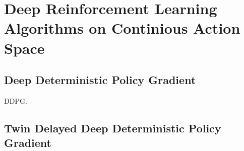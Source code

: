 \section{Deep Reinforcement Learning Algorithms on Continious Action Space}

\subsection{Deep Deterministic Policy Gradient}
\label{sec:ddpg}
DDPG.

\subsection{Twin Delayed Deep Deterministic Policy Gradient}
\label{sec:td3}
